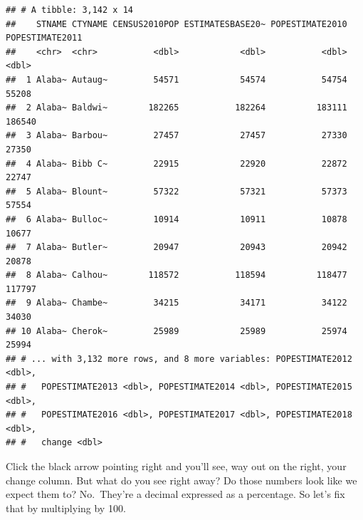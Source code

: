 \documentclass[]{book}
\newenvironment{Shaded}{\begin{snugshade}}{\end{snugshade}}
\newcommand{\DataTypeTok}[1]{\textcolor[rgb]{0.13,0.29,0.53}{#1}}
\newcommand{\DecValTok}[1]{\textcolor[rgb]{0.00,0.00,0.81}{#1}}
\newcommand{\KeywordTok}[1]{\textcolor[rgb]{0.13,0.29,0.53}{\textbf{#1}}}
\newcommand{\NormalTok}[1]{#1}
\newcommand{\OperatorTok}[1]{\textcolor[rgb]{0.81,0.36,0.00}{\textbf{#1}}}
\newcommand{\StringTok}[1]{\textcolor[rgb]{0.31,0.60,0.02}{#1}}
\begin{document}
\begin{verbatim}
## # A tibble: 3,142 x 14
##    STNAME CTYNAME CENSUS2010POP ESTIMATESBASE20~ POPESTIMATE2010 POPESTIMATE2011
##    <chr>  <chr>           <dbl>            <dbl>           <dbl>           <dbl>
##  1 Alaba~ Autaug~         54571            54574           54754           55208
##  2 Alaba~ Baldwi~        182265           182264          183111          186540
##  3 Alaba~ Barbou~         27457            27457           27330           27350
##  4 Alaba~ Bibb C~         22915            22920           22872           22747
##  5 Alaba~ Blount~         57322            57321           57373           57554
##  6 Alaba~ Bulloc~         10914            10911           10878           10677
##  7 Alaba~ Butler~         20947            20943           20942           20878
##  8 Alaba~ Calhou~        118572           118594          118477          117797
##  9 Alaba~ Chambe~         34215            34171           34122           34030
## 10 Alaba~ Cherok~         25989            25989           25974           25994
## # ... with 3,132 more rows, and 8 more variables: POPESTIMATE2012 <dbl>,
## #   POPESTIMATE2013 <dbl>, POPESTIMATE2014 <dbl>, POPESTIMATE2015 <dbl>,
## #   POPESTIMATE2016 <dbl>, POPESTIMATE2017 <dbl>, POPESTIMATE2018 <dbl>,
## #   change <dbl>
\end{verbatim}

Click the black arrow pointing right and you'll see, way out on the right, your change column. But what do you see right away? Do those numbers look like we expect them to? No.~They're a decimal expressed as a percentage. So let's fix that by multiplying by 100.

\begin{Shaded}
\end{Shaded}
\end{document}
